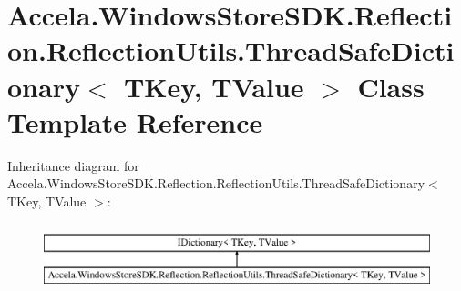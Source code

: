 \hypertarget{class_accela_1_1_windows_store_s_d_k_1_1_reflection_1_1_reflection_utils_1_1_thread_safe_diction5b81ab04ca8096f86dab87845d097065}{\section{Accela.\+Windows\+Store\+S\+D\+K.\+Reflection.\+Reflection\+Utils.\+Thread\+Safe\+Dictionary$<$ T\+Key, T\+Value $>$ Class Template Reference}
\label{class_accela_1_1_windows_store_s_d_k_1_1_reflection_1_1_reflection_utils_1_1_thread_safe_diction5b81ab04ca8096f86dab87845d097065}
}
Inheritance diagram for Accela.\+Windows\+Store\+S\+D\+K.\+Reflection.\+Reflection\+Utils.\+Thread\+Safe\+Dictionary$<$ T\+Key, T\+Value $>$\+:\begin{figure}[H]
\begin{center}
\leavevmode
\includegraphics[height=2.000000cm]{class_accela_1_1_windows_store_s_d_k_1_1_reflection_1_1_reflection_utils_1_1_thread_safe_diction5b81ab04ca8096f86dab87845d097065}
\end{center}
\end{figure}
